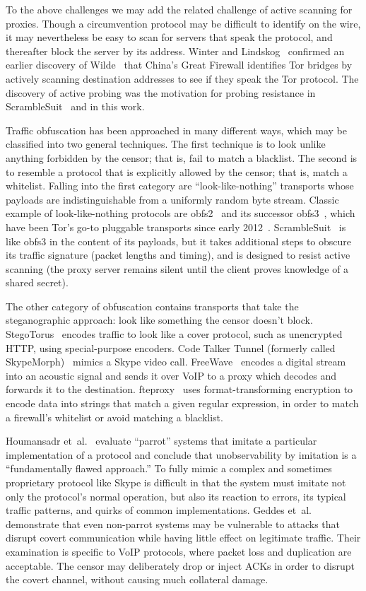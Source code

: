 \documentclass[conference]{IEEEtran}
\begin{document}
To the above challenges we may add the related challenge of active scanning for proxies.
Though a circumvention protocol may be difficult to identify on the wire,
it may nevertheless be easy to scan for servers that speak the protocol,
and thereafter block the server by its address.
Winter and Lindskog~\cite{foci12-winter} confirmed an earlier discovery of
Wilde~\cite{wilde} that China's Great Firewall identifies Tor bridges
by actively scanning destination addresses to see if they speak the Tor protocol.
The discovery of active probing was the motivation for probing resistance in ScrambleSuit~\cite{scramblesuit}
and in this work.

Traffic obfuscation has been approached in many different ways,
which may be classified into two general techniques.
The first technique is to look unlike
anything forbidden by the censor; that is, fail to match a blacklist. The second is
to resemble a protocol that is explicitly allowed by the censor; that is, match a whitelist.
Falling into the first category are ``look-like-nothing'' transports whose
payloads are indistinguishable from a uniformly random byte stream.
Classic example of look-like-nothing
protocols are obfs2~\cite{obfs2} and its successor obfs3~\cite{obfs3},
which have been Tor's go-to pluggable transports since early 2012~\cite{obfsproxy-arms-race}.
ScrambleSuit~\cite{scramblesuit} is like obfs3 in the
content of its payloads, but it takes additional steps to obscure its traffic signature
(packet lengths and timing), and is designed to resist active scanning
(the proxy server remains silent until the client proves knowledge of a shared
secret).

The other category of obfuscation contains transports that take the steganographic approach: look like
something the censor doesn't block. StegoTorus~\cite{stegotorus}
encodes traffic to look like a cover protocol, such as unencrypted HTTP,
using special-purpose encoders.
Code Talker
Tunnel (formerly called SkypeMorph)~\cite{skypemorph} mimics a Skype video call.
FreeWave~\cite{freewave} encodes a digital stream into an acoustic signal
and sends it over VoIP to a proxy which decodes and forwards it to the destination.
fteproxy~\cite{fte} uses format-transforming encryption to encode data into strings that match a given regular expression,
in order to match a firewall's whitelist or avoid matching a blacklist.

Houmansadr et~al.~\cite{parrot} evaluate ``parrot'' systems that imitate a particular implementation of a protocol
and conclude that unobservability by imitation is a ``fundamentally
flawed approach.''
To fully mimic a complex and sometimes proprietary protocol like Skype
is difficult in that the system must imitate not only the protocol's normal operation, but also its reaction to errors,
its typical traffic patterns, and quirks of common implementations.
Geddes et~al.~\cite{acks}
demonstrate that even non-parrot systems may be vulnerable to
attacks that disrupt covert communication while having little effect
on legitimate traffic. Their examination is specific to VoIP protocols,
where packet loss and duplication are acceptable. The censor may
deliberately drop or inject ACKs in order to disrupt the covert channel, without causing
much collateral damage.
\end{document}
